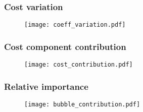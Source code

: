 \begin{frame}
    \frametitle{Cost variation}

    \begin{figure}
    \texttt{[image: coeff\_variation.pdf]}
    \end{figure}
\end{frame}

\begin{frame}
    \frametitle{Cost component contribution}

    \begin{figure}
    \texttt{[image: cost\_contribution.pdf]}
    \end{figure}
\end{frame}

\begin{frame}
    \frametitle{Relative importance}

    \begin{figure}
    \texttt{[image: bubble\_contribution.pdf]}
    \end{figure}
\end{frame}

